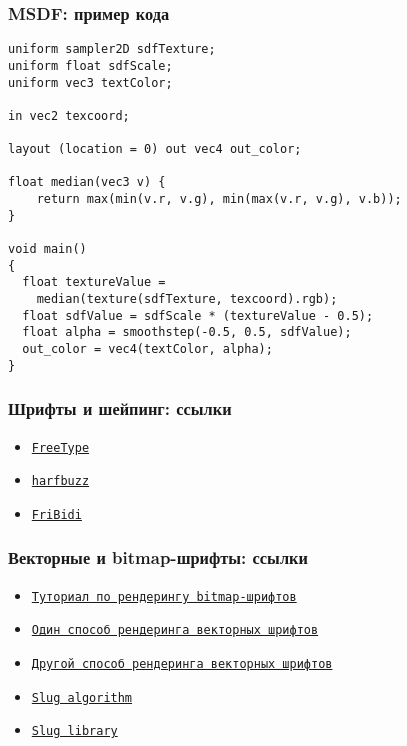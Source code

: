 \documentclass{beamer}
\begin{document}
\begin{frame}[fragile]
\frametitle{MSDF: пример кода}
\begin{verbatim}
uniform sampler2D sdfTexture;
uniform float sdfScale;
uniform vec3 textColor;

in vec2 texcoord;

layout (location = 0) out vec4 out_color;

float median(vec3 v) {
    return max(min(v.r, v.g), min(max(v.r, v.g), v.b));
}

void main()
{
  float textureValue =
    median(texture(sdfTexture, texcoord).rgb);
  float sdfValue = sdfScale * (textureValue - 0.5);
  float alpha = smoothstep(-0.5, 0.5, sdfValue);
  out_color = vec4(textColor, alpha);
}
\end{verbatim}
\end{frame}

\begin{frame}[fragile]
\frametitle{Шрифты и шейпинг: ссылки}
\begin{itemize}
\item \href{https://freetype.org}{\texttt{FreeType}}
\item \href{https://harfbuzz.github.io}{\texttt{harfbuzz}}
\item \href{https://github.com/fribidi/fribidi}{\texttt{FriBidi}}
\end{itemize}
\end{frame}

\begin{frame}[fragile]
\frametitle{Векторные и bitmap-шрифты: ссылки}
\begin{itemize}
\item \href{https://learnopengl.com/In-Practice/Text-Rendering}{\texttt{Туториал по рендерингу bitmap-шрифтов}}
\item \href{https://wdobbie.com/post/gpu-text-rendering-with-vector-textures}{\texttt{Один способ рендеринга векторных шрифтов}}
\item \href{https://medium.com/@evanwallace/easy-scalable-text-rendering-on-the-gpu-c3f4d782c5ac}{\texttt{Другой способ рендеринга векторных шрифтов}}
\item \href{https://jcgt.org/published/0006/02/02}{\texttt{Slug algorithm}}
\item \href{https://sluglibrary.com}{\texttt{Slug library}}
\end{itemize}
\end{frame}
\end{document}
